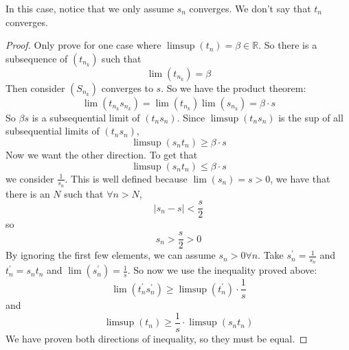 \documentclass{report}
\begin{document}
In this case, notice that we only assume $s_{n}$ converges. We don't say that $t_{n}$ converges.
    \begin{proof}
        Only prove for one case where $\limsup (t_{n}) = \beta \in \mathbb{R}$. So there is a subsequence of $(t_{n_{k}})$ such that 
            \begin{equation*}
                \lim(t_{n_{k}}) = \beta
            \end{equation*}
        Then consider $(S_{n_{k}})$ converges to $s$. So we have the product theorem:
            \begin{equation*}
                \lim(t_{n_{k}}s_{n_{k}}) = \lim(t_{n_{k}})\lim(s_{n_{k}}) = \beta \cdot s
            \end{equation*}
        So $\beta s$ is a subsequential limit of $(t_{n}s_{n})$. Since $\limsup (t_{n}s_{n})$ is the sup of all subsequential limits of $(t_{n}s_{n})$,
            \begin{equation*}
                \limsup (s_{n}t_{n}) \geq \beta \cdot s
            \end{equation*}
        Now we want the other direction. To get that
            \begin{equation*}
                \limsup (s_{n}t_{n}) \leq \beta \cdot s
            \end{equation*}
        we consider $\frac{1}{s_{n}}$. This is well defined because $\lim(s_{n}) = s > 0$, we have that there is an $N$ such that $\forall n > N$,
            \begin{equation*}
                \lvert s_{n} - s \rvert < \dfrac{s}{2}
            \end{equation*}
        so 
            \begin{equation*}
                s_{n} > \dfrac{s}{2} > 0
            \end{equation*}
        By ignoring the first few elements, we can assume $s_{n} > 0 \forall n$. Take $s_{n}^{\prime} = \frac{1}{s_{n}}$ and $t_{n}^{\prime} = s_{n}t_{n}$ and $\lim(s_{n}^{\prime}) = \frac{1}{s}$. So now we use the inequality proved above:
            \begin{equation*}
                \lim(t_{n}^{\prime}s_{n}^{\prime}) \geq \limsup(t_{n}^{\prime}) \cdot \dfrac{1}{s}
            \end{equation*}
        and
            \begin{equation*}
                \limsup(t_{n}) \geq \dfrac{1}{s} \cdot \limsup(s_{n}t_{n})
            \end{equation*}
        We have proven both directions of inequality, so they must be equal.
    \end{proof}
\end{document}

